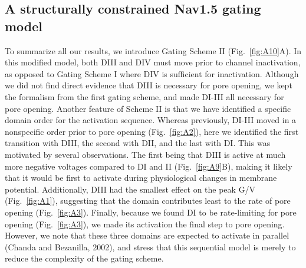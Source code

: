 \subsection{A structurally constrained Nav1.5 gating model}
To summarize all our results, we introduce Gating Scheme II (Fig.~\ref{fig:A10}A). In this modified model, both DIII and DIV must move prior to channel inactivation, as opposed to Gating Scheme I where DIV is sufficient for inactivation. Although we did not find direct evidence that DIII is necessary for pore opening, we kept the formalism from the first gating scheme, and made DI-III all necessary for pore opening. Another feature of Scheme II is that we have identified a specific domain order for the activation sequence. Whereas previously, DI-III moved in a nonspecific order prior to pore opening (Fig.~\ref{fig:A2}), here we identified the first transition with DIII, the second with DII, and the last with DI. This was motivated by several observations. The first being that DIII is active at much more negative voltages compared to DI and II (Fig.~\ref{fig:A9}B), making it likely that it would be first to activate during physiological changes in membrane potential. Additionally, DIII had the smallest effect on the peak G/V (Fig.~\ref{fig:A1}), suggesting that the domain contributes least to the rate of pore opening (Fig.~\ref{fig:A3}). Finally, because we found DI to be rate-limiting for pore opening (Fig.~\ref{fig:A3}), we made its activation the final step to pore opening. However, we note that these three domains are expected to activate in parallel (Chanda and Bezanilla, 2002), and stress that this sequential model is merely to reduce the complexity of the gating scheme. 

